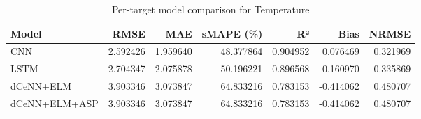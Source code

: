 \begin{table}
\caption{Per-target model comparison for Temperature}
\begin{tabular}{lrrrrrr}
\toprule
Model & RMSE & MAE & sMAPE (\%) & R² & Bias & NRMSE \\
\midrule
CNN & 2.592426 & 1.959640 & 48.377864 & 0.904952 & 0.076469 & 0.321969 \\
LSTM & 2.704347 & 2.075878 & 50.196221 & 0.896568 & 0.160970 & 0.335869 \\
dCeNN+ELM & 3.903346 & 3.073847 & 64.833216 & 0.783153 & -0.414062 & 0.480707 \\
dCeNN+ELM+ASP & 3.903346 & 3.073847 & 64.833216 & 0.783153 & -0.414062 & 0.480707 \\
\bottomrule
\end{tabular}
\end{table}
